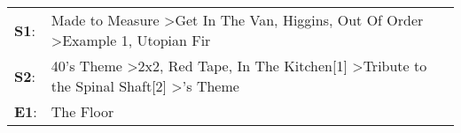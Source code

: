 \begin{supertabular}{p{0.03\textwidth}p{0.92\textwidth}}
 \textbf{S1}:  &                        Made to Measure\textsuperscript{} \textgreater \enspace Get In The Van\textsuperscript{}, \enspace Higgins\textsuperscript{}, \enspace Out Of Order\textsuperscript{} \textgreater \enspace Example 1\textsuperscript{}, \enspace Utopian Fir\textsuperscript{}  \enspace  \\
 \textbf{S2}:  &  40's Theme\textsuperscript{} \textgreater \enspace 2x2\textsuperscript{}, \enspace Red Tape\textsuperscript{}, \enspace In The Kitchen[1]\textsuperscript{} \textgreater \enspace Tribute to the Spinal Shaft[2]\textsuperscript{} \textgreater {}'s Theme\textsuperscript{}  \enspace  \\
 \textbf{E1}:  &                                                                                                                                                                                                                                                            The Floor\textsuperscript{}  \enspace  \\
\end{supertabular}
